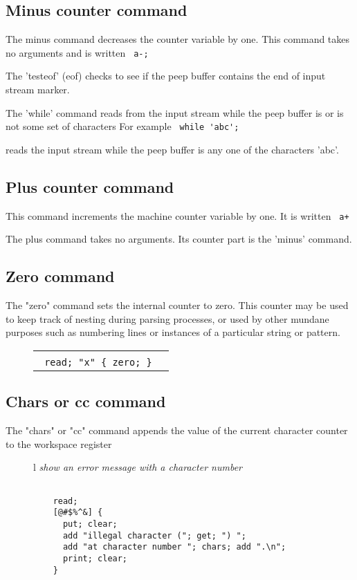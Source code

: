 \documentclass[a4paper,12pt]{article}
\begin{document}
\subsection{Minus counter command}
 
 The minus command decreases the counter variable by one.
 This command takes no arguments and is written 
 \verb| a-; |


  The 'testeof' (eof) checks to see if the peep buffer contains the
  end of input stream marker.

  The 'while' command reads from the input stream while the
  peep buffer is or is not some set of characters
  For example 
 \verb| while 'abc'; |

  reads the input stream while the peep buffer is any one of the
  characters 'abc'.

\subsection{Plus counter command}

 This command increments the machine counter variable by
 one. It is written 
 \verb| a+  |


 The plus command takes no arguments. Its counter part is the
 'minus' command.

\subsection{Zero command}
         
  The "zero" command sets the internal counter to zero. This counter may be
  used to keep track of nesting during parsing processes, or used by other
  mundane purposes such as numbering lines or instances of a particular string
  or pattern.
 \begin{figure}
 \begin{tabular}{ l }
 \emph{  } \\ 
 \verb| read; "x" { zero; }  |
 \end{tabular} 
 \end{figure}

\subsection{Chars or cc command}

  The "chars" or "cc" command appends the value of the current
  character counter to the workspace register
 \begin{figure}
 \begin{tabular}{ l }
 \emph{ show an error message with a character number } \\ 
 \begin{lstlisting}[breaklines] 

    read; 
    [@#$%^&] {
      put; clear; 
      add "illegal character ("; get; ") ";
      add "at character number "; chars; add ".\n";
      print; clear;
    }
  
 \end{lstlisting} 
 \end{tabular} 

 \end{figure}
\end{document}
